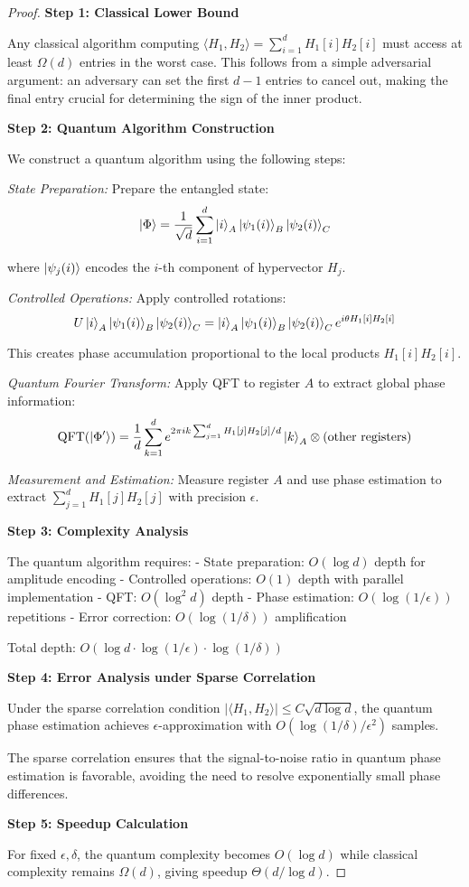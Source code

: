 \documentclass[11pt]{article}
\begin{document}
\begin{proof}
\textbf{Step 1: Classical Lower Bound}

Any classical algorithm computing $\langle H_1, H_2 \rangle = \sum_{i=1}^d H_1[i] H_2[i]$ must access at least $\Omega(d)$ entries in the worst case. This follows from a simple adversarial argument: an adversary can set the first $d-1$ entries to cancel out, making the final entry crucial for determining the sign of the inner product.

\textbf{Step 2: Quantum Algorithm Construction}

We construct a quantum algorithm using the following steps:

\textit{State Preparation:} Prepare the entangled state:
$$\ket{\Phi} = \frac{1}{\sqrt{d}} \sum_{i=1}^{d} \ket{i}_A \ket{\psi_1(i)}_B \ket{\psi_2(i)}_C$$

where $\ket{\psi_j(i)}$ encodes the $i$-th component of hypervector $H_j$.

\textit{Controlled Operations:} Apply controlled rotations:
$$U\ket{i}_A \ket{\psi_1(i)}_B \ket{\psi_2(i)}_C = \ket{i}_A \ket{\psi_1(i)}_B \ket{\psi_2(i)}_C e^{i\theta H_1[i]H_2[i]}$$

This creates phase accumulation proportional to the local products $H_1[i]H_2[i]$.

\textit{Quantum Fourier Transform:} Apply QFT to register $A$ to extract global phase information:
$$\text{QFT}(\ket{\Phi'}) = \frac{1}{d} \sum_{k=1}^{d} e^{2\pi i k \sum_{j=1}^d H_1[j]H_2[j]/d} \ket{k}_A \otimes \text{(other registers)}$$

\textit{Measurement and Estimation:} Measure register $A$ and use phase estimation to extract $\sum_{j=1}^d H_1[j]H_2[j]$ with precision $\epsilon$.

\textbf{Step 3: Complexity Analysis}

The quantum algorithm requires:
- State preparation: $O(\log d)$ depth for amplitude encoding
- Controlled operations: $O(1)$ depth with parallel implementation
- QFT: $O(\log^2 d)$ depth
- Phase estimation: $O(\log(1/\epsilon))$ repetitions
- Error correction: $O(\log(1/\delta))$ amplification

Total depth: $O(\log d \cdot \log(1/\epsilon) \cdot \log(1/\delta))$

\textbf{Step 4: Error Analysis under Sparse Correlation}

Under the sparse correlation condition $|\langle H_1, H_2 \rangle| \leq C\sqrt{d \log d}$, the quantum phase estimation achieves $\epsilon$-approximation with $O(\log(1/\delta)/\epsilon^2)$ samples.

The sparse correlation ensures that the signal-to-noise ratio in quantum phase estimation is favorable, avoiding the need to resolve exponentially small phase differences.

\textbf{Step 5: Speedup Calculation}

For fixed $\epsilon, \delta$, the quantum complexity becomes $O(\log d)$ while classical complexity remains $\Omega(d)$, giving speedup $\Theta(d/\log d)$.
\end{proof}
\end{document}
